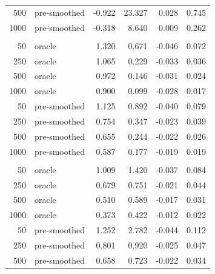 \documentclass[useAMS,usenatbib,referee]{biom}
\begin{document}
\begin{table}[t]
\begin{tabular}{rlrrrr}
\hspace{1em}500 & pre-smoothed & -0.922 & 23.327 & 0.028 & 0.745\\
\hspace{1em}1000 & pre-smoothed & -0.318 & 8.640 & 0.009 & 0.262\\
\addlinespace[0.3em]
\multicolumn{6}{l}{\textbf{Kernel}}\\
\hspace{1em}50 & oracle & 1.320 & 0.671 & -0.046 & 0.072\\
\hspace{1em}250 & oracle & 1.065 & 0.229 & -0.033 & 0.036\\
\hspace{1em}500 & oracle & 0.972 & 0.146 & -0.031 & 0.024\\
\hspace{1em}1000 & oracle & 0.900 & 0.099 & -0.028 & 0.017\\
\hspace{1em}50 & pre-smoothed & 1.125 & 0.892 & -0.040 & 0.079\\
\hspace{1em}250 & pre-smoothed & 0.754 & 0.347 & -0.023 & 0.039\\
\hspace{1em}500 & pre-smoothed & 0.655 & 0.244 & -0.022 & 0.026\\
\hspace{1em}1000 & pre-smoothed & 0.587 & 0.177 & -0.019 & 0.019\\
\addlinespace[0.3em]
\multicolumn{6}{l}{\textbf{Linear}}\\
\hspace{1em}50 & oracle & 1.009 & 1.420 & -0.037 & 0.084\\
\hspace{1em}250 & oracle & 0.679 & 0.751 & -0.021 & 0.044\\
\hspace{1em}500 & oracle & 0.510 & 0.589 & -0.017 & 0.031\\
\hspace{1em}1000 & oracle & 0.373 & 0.422 & -0.012 & 0.022\\
\hspace{1em}50 & pre-smoothed & 1.252 & 2.782 & -0.044 & 0.112\\
\hspace{1em}250 & pre-smoothed & 0.801 & 0.920 & -0.025 & 0.047\\
\hspace{1em}500 & pre-smoothed & 0.658 & 0.723 & -0.022 & 0.034\\

\end{tabular}
\end{table}
\end{document}
